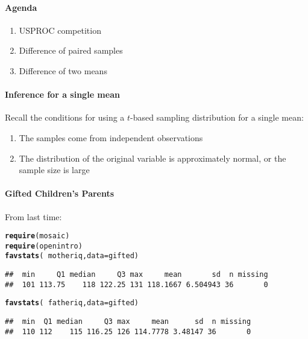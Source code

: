 \documentclass[10pt]{article}\usepackage[]{graphicx}\usepackage[]{color}
\makeatletter
\newcommand{\hlopt}[1]{\textcolor[rgb]{0,0,0}{#1}}%
\newcommand{\hlstd}[1]{\textcolor[rgb]{0.345,0.345,0.345}{#1}}%
\newcommand{\hlkwc}[1]{\textcolor[rgb]{0.333,0.667,0.333}{#1}}%
\newcommand{\hlkwd}[1]{\textcolor[rgb]{0.737,0.353,0.396}{\textbf{#1}}}%
\newenvironment{kframe}{%
 \def\at@end@of@kframe{}%
 \ifinner\ifhmode%
  \def\at@end@of@kframe{\end{minipage}}%
  \begin{minipage}{\columnwidth}%
 \fi\fi%
 \def\FrameCommand##1{\hskip\@totalleftmargin \hskip-\fboxsep
 \colorbox{shadecolor}{##1}\hskip-\fboxsep
     \hskip-\linewidth \hskip-\@totalleftmargin \hskip\columnwidth}%
 \MakeFramed {\advance\hsize-\width
   \@totalleftmargin\z@ \linewidth\hsize
   \@setminipage}}%
 {\par\unskip\endMakeFramed%
 \at@end@of@kframe}
\newenvironment{knitrout}{}{} %
\makeatother
\begin{document}
\paragraph{Agenda}
\begin{enumerate}
  \itemsep0em
  \item USPROC competition
  \item Difference of paired samples
  \item Difference of two means
\end{enumerate}


\paragraph{Inference for a single mean}
Recall the conditions for using a $t$-based sampling distribution for a single mean:
\begin{enumerate}
  \item The samples come from independent observations
  \item The distribution of the original variable is approximately normal, or the sample size is large
\end{enumerate}

\paragraph{Gifted Children's Parents}
From last time: 
\begin{knitrout}\footnotesize
{}\color{fgcolor}\begin{kframe}
\begin{alltt}
\hlkwd{require}\hlstd{(mosaic)}
\hlkwd{require}\hlstd{(openintro)}
\hlkwd{favstats}\hlstd{(}\hlopt{~}\hlstd{motheriq,} \hlkwc{data} \hlstd{= gifted)}
\end{alltt}
\begin{verbatim}
##  min     Q1 median     Q3 max     mean       sd  n missing
##  101 113.75    118 122.25 131 118.1667 6.504943 36       0
\end{verbatim}
\begin{alltt}
\hlkwd{favstats}\hlstd{(}\hlopt{~}\hlstd{fatheriq,} \hlkwc{data} \hlstd{= gifted)}
\end{alltt}
\begin{verbatim}
##  min  Q1 median     Q3 max     mean      sd  n missing
##  110 112    115 116.25 126 114.7778 3.48147 36       0
\end{verbatim}
\end{kframe}
\end{knitrout}
\end{document}
